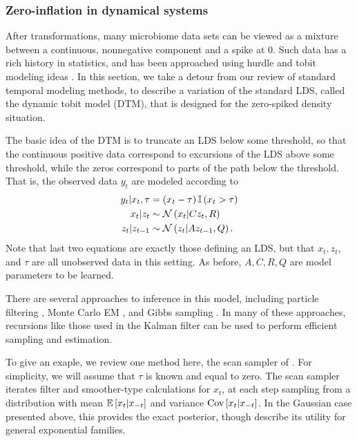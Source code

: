 \documentclass[14pt]{extarticle}
\begin{document}
\subsubsection{Zero-inflation in dynamical systems}
\label{subsubsec:zero_inflation_dynamical}

After transformations, many microbiome data sets can be viewed as a mixture
between a continuous, nonnegative component and a spike at 0. Such data has a
rich history in statistics, and has been approached using hurdle and tobit
modeling ideas \citep{min2002modeling}. In this section, we take a detour from
our review of standard temporal modeling methods, to describe a variation of the
standard LDS, called the dynamic tobit model (DTM), that is designed for the
zero-spiked density situation.

The basic idea of the DTM is to truncate an LDS below some threshold, so that
the continuous positive data correspond to excursions of the LDS above some
threshold, while the zeros correspond to parts of the path below the threshold.
That is, the observed data $y_t$ are modeled according to
\begin{align*}
  y_{t} \vert x_t, \tau &= \left(x_t - \tau\right)\mathbb{I}\left({x_t > \tau}\right)  \\
  x_t \vert z_t &\sim \mathcal{N}\left(x_t \vert C z_{t}, R\right) \\
  z_t \vert z_{t - 1} &\sim \mathcal{N}\left(z_t \vert A z_{t - 1}, Q\right).
\end{align*}
Note that last two equations are exactly those defining an LDS, but that $x_t,
z_t$, and $\tau$ are all unobserved data in this setting. As before, $A, C, R,
Q$ are model parameters to be learned.

There are several approaches to inference in this model, including particle
filtering \citep{doucet2000rao}, Monte Carlo EM \citep{manrique1998simulation},
and Gibbs sampling \citep{de1997scan, wei1999bayesian}. In many of these
approaches, recursions like those used in the Kalman filter can be used to
perform efficient sampling and estimation.

To give an exaple, we review one method here, the scan sampler of
\cite{de1997scan}. For simplicity, we will assume that $\tau$ is known and
equal to zero. The scan sampler iterates filter and smoother-type calculations
for $x_t$, at each step sampling from a distribution with mean $\mathbb{E}\left[{x_t \vert
  x_{-t}}\right]$ and variance $\mathrm{Cov}\left[{x_t \vert x_{-t}}\right]$. In the Gaussian case
presented above, this provides the exact posterior, though \cite{de1997scan}
describe its utility for general exponential families.
\end{document}
